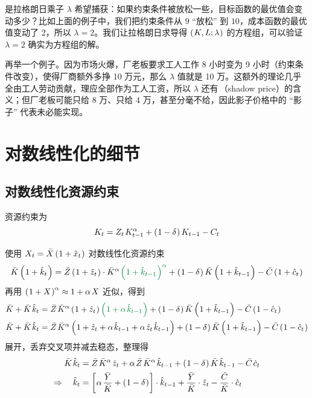 是拉格朗日乘子 \(\lambda\) 希望捕获：如果约束条件被放松一些，目标函数的最优值会变动多少？比如上面的例子中，我们把约束条件从 \(9\) “放松” 到 \(10\)，成本函数的最优值变动了 2，所以 \(\lambda=2\)。我们让拉格朗日求导得 \(\left(\mspace{1mu} K,L;\lambda\mspace{1mu}\right)\) 的方程组，可以验证 \(\lambda=2\) 确实为方程组的解。

再举一个例子。因为市场火爆，厂老板要求工人工作 8 小时变为 9 小时（约束条件改变），使得厂商额外多挣 10 万元，那么 \(\lambda\) 值就是 10 万。这额外的理论几乎全由工人劳动贡献，理应全部作为工人工资，所以 \(\lambda\) 还有\,（shadow price）的含义；但厂老板可能只给 8 万、只给 4 万，甚至分毫不给，因此影子价格中的 “影子” 代表未必能实现。

\section{对数线性化的细节}\label{sec:LogLinProcess}

\subsection{对数线性化资源约束}

资源约束为
\begin{equation*}
    K_t=Z_t\,K\lt^\alpha+\bka{1-\delta}K\lt-C_t
\end{equation*}


使用 \(X_t=\bar X\left(\mspace{1mu}1+\hat x_t\mspace{1mu}\right)\) 对数线性化资源约束
\begin{align*}
    \bar K\bka{1+\hat k_t}=\bar Z\bka{1+\hat z_t}\cdot \bar K^{\alpha}\,\fafugreen{\bka{1+\hat k\lt}^\alpha}+\bka{1-\delta}\bar K\bka{1+\hat k\lt}-\bar C\bka{1+\hat c_t}
\end{align*}
再用 \(\bka{1+X}^\alpha\approx1+\alpha\,X\) 近似，得到
\begin{align*}
    \bar K+\bar K\,\hat k_t&=\bar Z\,\bar K^{\alpha}\bka{1+\hat z_t}\fafugreen{\bka{1+\alpha\,\hat k\lt}}+\bka{1-\delta}\bar K\bka{1+\hat k\lt}-\bar C\bka{1-\hat c_t}\\
    \bar K+\bar K\,\hat k_t&=\bar Z\,\bar K^\alpha\bka{1+\hat z_t+\alpha\,\hat k\lt+\alpha\,\hat z_t\,\hat k\lt}+\bka{1-\delta}\bar K\bka{1+\hat k\lt}-\bar C\bka{1-\hat c_t}
\end{align*}
展开，丢弃交叉项并减去稳态，整理得
\begin{align*}
    \bar K\,\hat k_t&=\bar Z\,\bar K^\alpha\,\hat z_t+\alpha\,\bar Z\,\bar K^\alpha\,\hat k\lt+\bka{1-\delta}\bar K\,\hat k\lt-\bar C\,\hat c_t\\
    \Rightarrow\quad \hat k_t&=\bks{\alpha\,\dfrac{\bar Y}{\bar K}+\bka{1-\delta}}\cdot\hat k\lt+\dfracb{Y}{K}\cdot\hat z_t-\dfracb{C}{K}\cdot\hat c_t
\end{align*}

